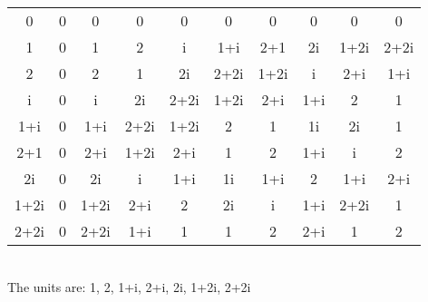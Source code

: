 \documentclass[sigconf]{article}
\begin{document}
\begin{enumerate}
\begin{tabular}{c | ccccccccc}
      \hline
      0    & 0    & 0    & 0    & 0    & 0    & 0    & 0    & 0    & 0 \\
      1    & 0    & 1    & 2    & i    & 1+i  & 2+1  & 2i   & 1+2i & 2+2i \\
      2    & 0    & 2    & 1    & 2i   & 2+2i & 1+2i & i    & 2+i  & 1+i \\
      i    & 0    & i    & 2i   & 2+2i & 1+2i & 2+i  & 1+i  & 2    & 1 \\
      1+i  & 0    & 1+i  & 2+2i & 1+2i & 2    & 1    & 1i   & 2i   & 1 \\
      2+1  & 0    & 2+i  & 1+2i & 2+i  & 1    & 2    & 1+i  & i    & 2 \\
      2i   & 0    & 2i   & i    & 1+i  & 1i   & 1+i  & 2    & 1+i  & 2+i \\
      1+2i & 0    & 1+2i & 2+i  & 2    & 2i   & i    & 1+i  & 2+2i & 1 \\
      2+2i & 0    & 2+2i & 1+i  & 1    & 1    & 2    & 2+i  & 1    & 2 \\
    \end{tabular}\\
    The units are: 1, 2, 1+i, 2+i, 2i, 1+2i, 2+2i
\end{enumerate}



\end{document}
